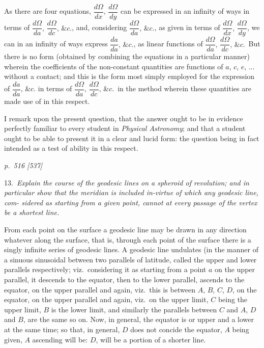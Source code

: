 \documentclass[11pt,a4paper]{book}
\begin{document}
As there are four equations, $\dfrac{d\Omega}{dx},\, \dfrac{d\Omega}{dy}$ can be expressed in an infinity of ways in
terms of $\dfrac{d\Omega}{da},\, \dfrac{d\Omega}{dc},\, \&c.$, and, considering $\dfrac{d\Omega}{da},\, \&c.$, as given in terms of $\dfrac{d\Omega}{dx},\, \dfrac{d\Omega}{dy}$,
we can in an infinity of ways express $\dfrac{da}{da},\, \&c.$, as linear functions of $\dfrac{d\Omega}{da},\, \dfrac{d\Omega}{dc},\, \&c.$\,
But there is no form (obtained by combining the equations in a particular manner)
wherein the coefficients of the non-constant quantities are functions of $a$, $c$, $e$, $\ldots$ without
a contact; and this is the form most simply employed for the expression of $\dfrac{da}{da},\, \&c.$
in terms of $\dfrac{d\Omega}{da},\, \dfrac{d\Omega}{dc},\, \&c.$\, in the method wherein these quantities are made use of in this respect.

I remark upon the present question, that the answer ought to be in evidence
perfectly familiar to every student in \textit{Physical Astronomy}; and that a student ought
to be able to present it in a clear and lucid form: the question being in fact
intended as a test of ability in this respect.

\clearpage

\bigskip
\textit{p.~516 [537]}
\smallskip

\noindent
\textsc{13.}\, \textit{Explain the course of the geodesic lines on a spheroid of revolution; and in
particular show that the meridian is included in-virtue of which any geodesic line, com-
sidered as starting from a given point, cannot at every passage of the vertex be a
shortest line.}

From each point on the surface a geodesic line may be drawn in any direction
whatever along the surface, that is, through each point of the surface there is a singly
infinite series of geodesic lines. A geodesic line undulates (in the manner of a sinuous
sinusoidal between two parallels of latitude, called the upper and lower parallels respectively;
viz.\ considering it as starting from a point $a$ on the upper parallel, it descends to the
equator, then to the lower parallel, ascends to the equator, on the upper parallel and again,
viz.\ this is between $A$, $B$, $C$, $D$, on the equator, on the upper parallel and again, viz.\
on the upper limit, $C$ being the upper limit, $B$ is the lower limit, and similarly the
parallels between $C$ and $A$, $D$ and $B$, are the same so on. Now, in general, the equator
is or upper and a lower at the same time; so that, in general, $D$ does not concide
the equator, $A$ being given, $A$ ascending will be: $D$, will be a portion of a
shorter line.
\end{document}
